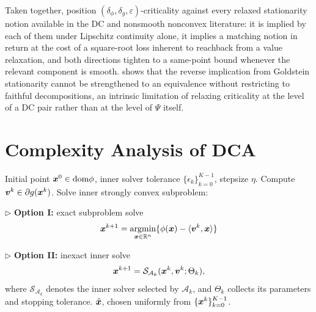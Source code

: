 \documentclass[english]{article}
\begin{document}
Taken together,
position $(\delta_\phi,\delta_g,\varepsilon)$-criticality against every
relaxed stationarity notion available in the DC and nonsmooth nonconvex
literature: it is implied by each of them under Lipschitz continuity
alone, it implies a matching notion in return at the cost of a
square-root loss inherent to reachback from a value relaxation, and both
directions tighten to a same-point bound whenever the relevant component
is smooth.  shows that the reverse
implication from Goldstein stationarity cannot be strengthened to an
equivalence without restricting to faithful decompositions, an intrinsic
limitation of relaxing criticality at the level of a DC pair rather than
at the level of $\Psi$ itself.

\section{Complexity Analysis of DCA}
\label{sec:complexity-analysis-DCA}
\begin{algorithm}[tbp]
    \caption{\textbf{(In)exact DCA}}
    \label{alg: DCA}
    \begin{algorithmic}[1]
         Initial point $\bm{x}^0\in\mathrm{dom} \phi $,
        inner solver tolerance $\{\epsilon_k\}_{k=0}^{K-1}$,
        stepsize $\eta$.
            \STATE Compute $\bm{v}^k \in \partial g(\bm{x}^k)$.
            \STATE 
            Solve inner strongly convex subproblem:

            \STATE $\triangleright$ \textbf{Option I:} exact subproblem solve
            \begin{align}
            \label{eq:dca-exact-step}
            \bm{x}^{k+1} = \operatorname*{\mathrm{argmin}}\limits_{\bm{x} \in \mathbb{R}^n } \{ \phi (\bm{x})- \langle \bm{v}^k, \bm{x} \rangle \} 
            \end{align}

            \STATE $\triangleright$ \textbf{Option II:} inexact inner solve
            \begin{align}
            \label{eq:dca-inner-solver-step}
            \bm{x}^{k+1}
            =
            \mathcal S_{\mathcal A_k}(\bm{x}^k,\bm{v}^k;\Theta_k),
            \end{align}
            where $\mathcal S_{\mathcal A_k}$ denotes the inner solver selected
            by $\mathcal A_k$, and $\Theta_k$ collects its parameters and
            stopping tolerance.
        \ENDFOR
         $\hat{\bm{x}}$, chosen uniformly from
        $\{\bm{x}^k\}_{k=0}^{K-1}$.
    \end{algorithmic}
\end{algorithm} 
\end{document}

